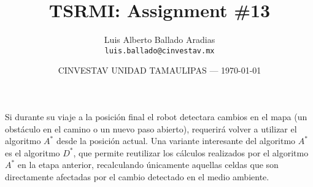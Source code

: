 \documentclass{article}
\title{TSRMI: Assignment \#13} %
\author{Luis Alberto Ballado Aradias\\ \texttt{luis.ballado@cinvestav.mx}} %
\date{CINVESTAV UNIDAD TAMAULIPAS --- \today} %
\begin{document}
\maketitle %


Si durante su viaje a la posición final el robot detectara cambios en el mapa (un obstáculo en el camino o un nuevo paso abierto), requerirá volver a utilizar el algoritmo $A^{*}$ desde la posición actual. Una variante interesante del algoritmo $A^{*}$ es el algoritmo $D^{*}$, que permite reutilizar los cálculos realizados por el algoritmo $A^{*}$ en la etapa anterior, recalculando únicamente aquellas celdas que son directamente afectadas por el cambio detectado en el medio ambiente.\\
\end{document}
